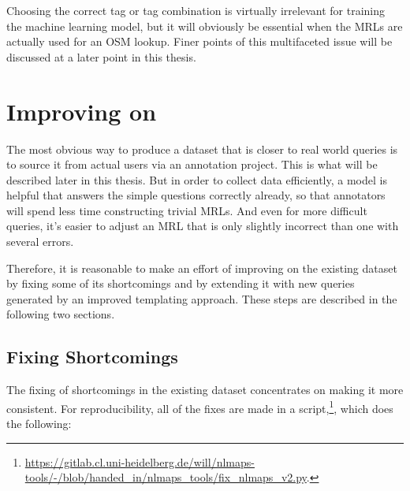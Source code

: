Choosing the correct tag or tag combination is virtually irrelevant for training
the machine learning model, but it will obviously be essential when the MRLs are
actually used for an OSM lookup. Finer points of this multifaceted issue will be
discussed at a later point in this thesis.

\section{Improving on \nlmapstwo{}}

The most obvious way to produce a dataset that is closer to real world queries
is to source it from actual users via an annotation project. This is what will
be described later in this thesis. But in order to collect data efficiently, a
model is helpful that answers the simple questions correctly already, so that
annotators will spend less time constructing trivial MRLs. And even for more
difficult queries, it’s easier to adjust an MRL that is only slightly incorrect
than one with several errors.

Therefore, it is reasonable to make an effort of improving on the existing
\nlmapstwo{} dataset by fixing some of its shortcomings and by extending it with
new queries generated by an improved templating approach. These steps are
described in the following two sections.

\subsection{Fixing \nlmapstwo{} Shortcomings}

The fixing of shortcomings in the existing dataset concentrates on making it
more consistent. For reproducibility, all of the fixes are made in a
script,\footnote{\url{https://gitlab.cl.uni-heidelberg.de/will/nlmaps-tools/-/blob/handed_in/nlmaps_tools/fix_nlmaps_v2.py}.},
which does the following:

